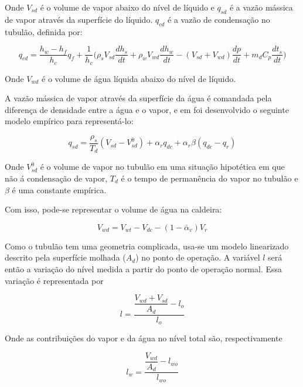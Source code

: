 Onde $V_{sd}$ é o volume de vapor abaixo do nível de líquido e
$q_{sd}$ é a vazão mássica de vapor através da superfície do
líquido. $q_{cd}$ é a vazão de condensação no tubulão, definida por:

\begin{equation}
  q_{cd} = \dfrac{h_w - h_f}{h_c} q_f + \dfrac{1}{h_c} \biggl( \rho_s
  V_{sd} \dfrac{dh_s}{dt} + \rho_w V_{wd} \dfrac{dh_w}{dt} - (V_{sd} +
  V_{wd}) \dfrac{dp}{dt} + m_d C_p \dfrac{dt_s}{dt} \biggr)
  \label{q_cd}
\end{equation}

Onde $V_{wd}$ é o volume de água líquida abaixo do nível de líquido.

A vazão mássica de vapor através da superfície da água é comandada
pela diferença de densidade entre a água e o vapor, e em
 foi desenvolvido o seguinte modelo empírico para
representá-lo:

\begin{equation}
  q_{sd} = \dfrac{\rho_s}{T_d}(V_{sd} - V_{sd}^0) + \alpha_r q_{dc} +
  \alpha_r \beta (q_{dc} - q_r)
  \label{q_sd}
\end{equation}

Onde $V_{sd}^0$ é o volume de vapor no tubulão em uma situação
hipotética em que não á condensação de vapor, $T_d$ é o tempo de
permanência do vapor no tubulão e $\beta$ é uma constante empírica.

Com isso, pode-se representar o volume de água na caldeira:

\begin{equation}
  V_{wd} = V_{wt} - V_{dc} - (1 - \bar{\alpha}_v) V_r
  \label{V_wd}
\end{equation}

Como o tubulão tem uma geometria complicada, usa-se um modelo
linearizado descrito pela superfície molhada ($A_d$) no ponto de
operação. A variável $l$ será então a variação do nível medida a
partir do ponto de operação normal. Essa variação é representada por

\begin{equation}
  l = \dfrac{\dfrac{V_{wd} + V_{sd}}{A_d} - l_o}{l_o}
  \label{nivel_agua}
\end{equation}

Onde as contribuições do vapor e da água no nível total são,
respectivamente

\begin{equation}
  l_w = \dfrac{\dfrac{V_{wd}}{A_d} - l_{wo}}{l_{wo}}
  \label{contrib_w_nivel}
\end{equation}

